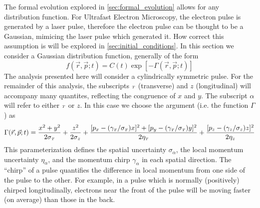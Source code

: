 The formal evolution explored in \ref{sec:formal_evolution} allows for any distribution function.
For Ultrafast Electron Microscopy, the electron pulse is generated by a laser pulse, therefore the electron pulse can be thought to be a Gaussian, mimicing the laser pulse which generated it.
How correct this assumption is will be explored in \ref{sec:initial_conditions}.
In this section we consider a Gaussian distribution function, generally of the form
\begin{equation}
  f(\vec{r}, \vec{p}; t) = C(t)\exp \left[ - \Gamma(\vec{r}, \vec{p}; t) \right]
\end{equation}
The analysis presented here will consider a cylindrically symmetric pulse.
For the remainder of this analysis, the subscripts ${\scriptscriptstyle T}$ (transverse) and $z$ (longitudinal) will accompany many quantites, reflecting the congruence of $x$ and $y$.
The subscript $\alpha$ will refer to either ${\scriptscriptstyle T}$ or $z$.
In this case we choose the argument (i.e. the function $\Gamma$) as
\begin{equation} \label{eq:gaussian_exponent}
  \Gamma(\vec{r}, \vec{p}; t) =
  \frac{x^2 + y^2}{2 \sigma_{{\scriptscriptstyle T}}} + \frac{z^2}{2 \sigma_{z}}
  + \frac{
    [p_x - (\gamma_{{\scriptscriptstyle T}}/\sigma_{{\scriptscriptstyle T}}) x ]^2 
    + [p_y - (\gamma_{{\scriptscriptstyle T}}/\sigma_{{\scriptscriptstyle T}}) y ]^2
  }{2 \eta_{{\scriptscriptstyle T}}}
  + \frac{ [p_z - (\gamma_{z}/\sigma_{z}) z ]^2 }{2 \eta_{z}}
\end{equation}
This parameterization defines the spatial uncertainty $\sigma_{\alpha}$, the local momentum uncertainty $\eta_{\alpha}$, and the momentum chirp $\gamma_{\alpha}$ in each spatial direction.
The ``chirp'' of a pulse quantifies the difference in local momentum from one side of the pulse to the other.
For example, in a pulse which is normally (positively) chirped longitudinally, electrons near the front of the pulse will be moving faster (on average) than those in the back.

